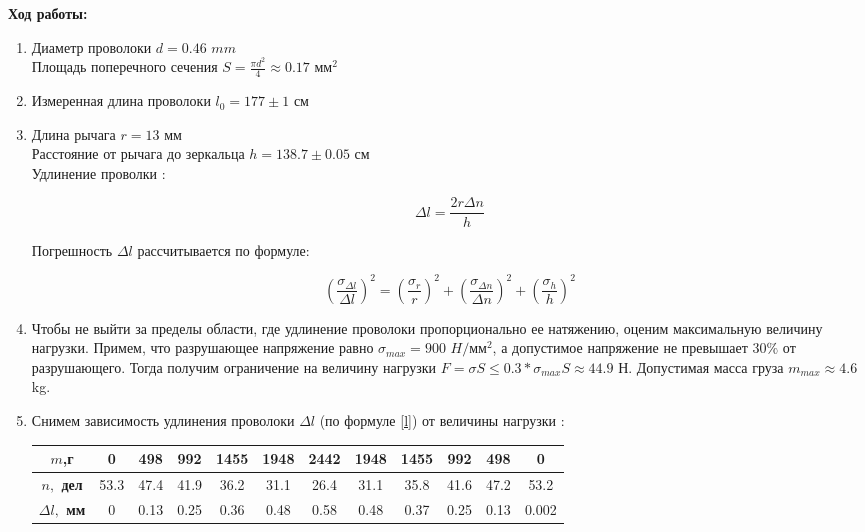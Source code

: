 \documentclass[8pt]{article}
\begin{document}
    \textbf{Ход работы:}\\
    \begin{enumerate}
    \item 
        Диаметр проволоки $d = 0.46$ $mm$ \\
        Площадь поперечного сечения $S = \frac{\pi d^2}{4} \approx 0.17$ $\text{мм}^2$\\ 
    \item 
        Измеренная длина проволоки $l_0 = 177 \pm 1$ см
    \item 
        Длина рычага $r = 13$ мм \\
        Расстояние от рычага до зеркальца $h = 138.7 \pm 0.05$ см \\
        Удлинение проволки : 

        \begin{equation} \label{l}
            \Delta l = \frac{2r\Delta n}{h}
        \end{equation}

        Погрешность $\Delta l$ рассчитывается по формуле:
    
        \begin{equation} \label{dl}
        \left(\frac{\sigma_{\Delta l}}{\Delta l}\right)^2 
        = \left(\frac{\sigma_{r}}{r}\right)^2
        + \left(\frac{\sigma_{\Delta n}}{\Delta n}\right)^2
        + \left(\frac{\sigma_{h}}{h}\right)^2
        \end{equation}
    \item
        Чтобы не выйти за пределы области, где удлинение проволоки пропорционально ее натяжению, оценим максимальную величину нагрузки. Примем, что разрушающее напряжение равно $\sigma_{max} = 900$ $H/\text{мм}^2$, а допустимое напряжение не превышает $30\%$ от разрушающего.
        Тогда получим ограничение на величину нагрузки $F = \sigma S \leq 0.3 * \sigma_{max} S \approx 44.9$ Н. 
        Допустимая масса груза $m_{max} \approx 4.6 $ kg.

    \item 
        Снимем зависимость удлинения проволоки $\Delta l$ (по формуле \eqref{l})  от величины нагрузки :
    
    
    \begin{center}
    \begin{tabular}{|c|c|c|c|c|c|c|c|c|c|c|c|}
        \hline
        \textbf{$m$,г} & 0 & 498 & 992 & 1455 & 1948 & 2442 & 1948 & 1455 & 992 & 498 & 0 \\
        \hline
        \textbf{$n,$ дел} & 53.3 & 47.4 & 41.9 & 36.2 & 31.1 & 26.4 & 31.1 & 35.8 & 41.6 & 47.2 & 53.2 \\
        \hline
        \textbf{$\Delta l,$ мм} & 0 & 0.13 & 0.25 & 0.36 & 0.48 & 0.58 & 0.48 & 0.37 & 0.25 & 0.13 & 0.002\\
        \hline
    \end{tabular}
    \end{center}


\end{enumerate}
\end{document}
